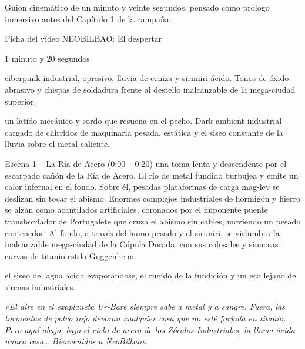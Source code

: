 Guion cinemático de un minuto y veinte segundos, pensado como prólogo inmersivo antes del Capítulo 1 de la campaña.

\begin{CajaCinematica}{Ficha del vídeo}
 NEOBILBAO: El despertar\par
{} 1 minuto y 20 segundos\par
{} ciberpunk industrial, opresivo, lluvia de ceniza y sirimiri ácido. Tonos de óxido abrasivo y chispas de soldadura frente al destello inalcanzable de la mega-ciudad superior.\par
{} un latido mecánico y sordo que resuena en el pecho. Dark ambient industrial cargado de chirridos de maquinaria pesada, estática y el siseo constante de la lluvia sobre el metal caliente.
\end{CajaCinematica}

\begin{CajaCinematica}{Escena 1 -- La Ría de Acero (0:00 -- 0:20)}
 una toma lenta y descendente por el escarpado cañón de la Ría de Acero. El río de metal fundido burbujea y emite un calor infernal en el fondo. Sobre él, pesadas plataformas de carga mag-lev se deslizan sin tocar el abismo. Enormes complejos industriales de hormigón y hierro se alzan como acantilados artificiales, coronados por el imponente puente transbordador de Portugalete que cruza el abismo sin cables, moviendo un pesado contenedor. Al fondo, a través del humo pesado y el sirimiri, se vislumbra la inalcanzable mega-ciudad de la Cúpula Dorada, con sus colosales y sinuosas curvas de titanio estilo Guggenheim.\par
{} el siseo del agua ácida evaporándose, el rugido de la fundición y un eco lejano de sirenas industriales.\par
{}\par
\textit{«El aire en el exoplaneta Ur-Bare siempre sabe a metal y a sangre. Fuera, las tormentas de polvo rojo devoran cualquier cosa que no esté forjada en titanio. Pero aquí abajo, bajo el cielo de acero de los Zócalos Industriales, la lluvia ácida nunca cesa\ldots{} Bienvenidos a NeoBilbao».}
\end{CajaCinematica}

